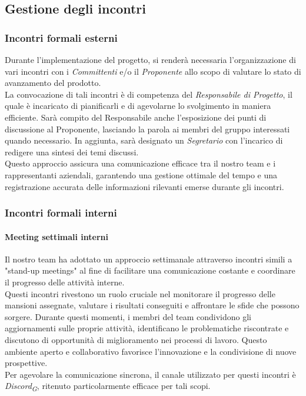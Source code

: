 \documentclass{article}
\begin{document}
    \subsection{Gestione degli incontri}
        \subsubsection{Incontri formali esterni}
        Durante l'implementazione del progetto, si renderà necessaria l'organizzazione di vari incontri con i \textit{Committenti} e/o il \textit{Proponente} allo scopo di valutare lo stato di avanzamento del prodotto.\\
        La convocazione di tali incontri è di competenza del \textit{Responsabile di Progetto}, il quale è incaricato di pianificarli e di agevolarne lo svolgimento in maniera efficiente. Sarà compito del Responsabile anche l'esposizione dei punti di discussione al Proponente, lasciando la parola ai membri del gruppo interessati quando necessario.
        In aggiunta, sarà designato un \textit{Segretario} con l'incarico di redigere una sintesi dei temi discussi. \\
        Questo approccio assicura una comunicazione efficace tra il nostro team e i rappresentanti aziendali, garantendo una gestione ottimale del tempo e una registrazione accurata delle informazioni rilevanti emerse durante gli incontri.
               
        \subsubsection{Incontri formali interni}
        \paragraph{Meeting settimali interni}
        Il nostro team ha adottato un approccio settimanale attraverso incontri simili a "stand-up meetings" al fine di facilitare una comunicazione costante e coordinare il progresso delle attività interne.\\
        Questi incontri rivestono un ruolo cruciale nel monitorare il progresso delle mansioni assegnate, valutare i risultati conseguiti e affrontare le sfide che possono sorgere. Durante questi momenti, i membri del team condividono gli aggiornamenti sulle proprie attività, identificano le problematiche riscontrate e discutono di opportunità di miglioramento nei processi di lavoro. Questo ambiente aperto e collaborativo favorisce l'innovazione e la condivisione di nuove prospettive.\\
        Per agevolare la comunicazione sincrona, il canale utilizzato per questi incontri è \textit{Discord}\textsubscript{\textit{G}}, ritenuto particolarmente efficace per tali scopi.
\end{document}

